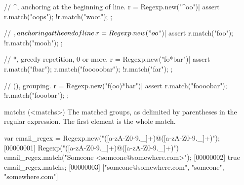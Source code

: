 \begin{urbiscriptapi}
\begin{urbiscript}
// ^, anchoring at the beginning of line.
r = Regexp.new("^oo")|
assert
{
  r.match("oops");
  !r.match("woot");
};

// $, anchoring at the end of line.
r = Regexp.new("oo$")|
assert
{
  r.match("foo");
  !r.match("mooh");
};

// *, greedy repetition, 0 or more.
r = Regexp.new("fo*bar")|
assert
{
  r.match("fbar");
  r.match("fooooobar");
  !r.match("far");
};

// (), grouping.
r = Regexp.new("f(oo)*bar")|
assert
{
  r.match("foooobar");
  !r.match("fooobar");
};
\end{urbiscript}

\item[matchs](<matchs>)%
  The matched groups, as delimited by parentheses in the regular
  expression. The first element is the whole match.

\begin{urbiscript}
var email_regex = Regexp.new("([a-zA-Z0-9._]+)@([a-zA-Z0-9._]+)");
[00000001] Regexp("([a-zA-Z0-9._]+)@([a-zA-Z0-9._]+)")
email_regex.match("Someone <someone@somewhere.com>");
[00000002] true
email_regex.matchs;
[00000003] ["someone@somewhere.com", "someone", "somewhere.com"]
\end{urbiscript}

\end{urbiscriptapi}

